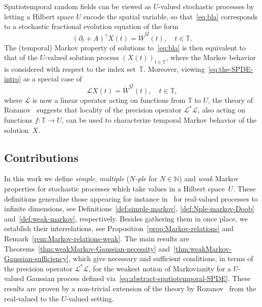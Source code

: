\documentclass[reqno]{amsart}
\numberwithin{equation}{section}
\newcommand{\bbT}{\mathbb{T}}
\newcommand{\N}{\mathbb{N}}
\newcommand{\cL}{\mathcal{L}}
\newcommand{\from}{\colon}
\theoremstyle{remark}
\theoremstyle{definition}
\begin{document}
Spatiotemporal random fields 
can be viewed as 
$U$-valued stochastic processes by 
letting a Hilbert space $U$ encode the spatial variable,
so that~\eqref{eq:bla} corresponds to
a stochastic fractional evolution equation 
of the form 
%
\begin{equation}\label{eq:the-SPDE-intro}
	(\partial_t + A)^\gamma X(t) = \dot W^Q(t), \quad t \in \bbT.
\end{equation}
%
The (temporal) Markov property of solutions to~\eqref{eq:bla} is then 
equivalent to that of the $U$-valued solution process $(X(t))_{t\in\bbT}$, 
where the Markov behavior is considered 
with respect to the index set~$\bbT$. 
Moreover, viewing~\eqref{eq:the-SPDE-intro} as a special case
of
%
\begin{equation}\label{eq:abstract-spatiotemporal-SPDE}
	\cL X(t) = \dot W^Q(t), 
	\quad 
	t \in \bbT,
\end{equation}
%
where $\cL$ is now a linear operator acting on functions from $\bbT$ to $U$,
the theory of Rozanov~\cite{Rozanov1982} suggests that 
locality of the precision operator $\cL^*\! \cL$,
also acting on functions $f \from \bbT \to U$, can be used to
characterize
temporal Markov behavior of the solution~$X$.

\subsection{Contributions}
In this work we define 
\emph{simple}, \emph{multiple} (\emph{$N$-ple} for $N \in \N$) and \emph{weak} Markov properties 
for stochastic processes which take values in a Hilbert space~$U$. 
These definitions generalize   
those appearing for instance in~\cite{HidaHitsuda1993, RevuzYor1999, Rozanov1982} 
for real-valued processes to infinite dimensions,  
see Definitions~\ref{def:simple-markov}, \ref{def:Nple-markov-Doob} and~\ref{def:weak-markov},
respectively.
Besides gathering them in once place, we establish their interrelations,
see Proposition~\ref{prop:Markov-relations} and Remark~\ref{rem:Markov-relations-weak}.
The main results are Theorems~\ref{thm:weakMarkov-Gaussian-necessity} and~\ref{thm:weakMarkov-Gaussian-sufficiency},
which give necessary and sufficient conditions, 
in terms of the precision operator $\cL^*\! \cL$, for the weakest notion of Markovianity for a $U$-valued
Gaussian process defined via~\eqref{eq:abstract-spatiotemporal-SPDE}.
These results are proven by a non-trivial extension of the theory by Rozanov~\cite[Chapters~2 and~3]{Rozanov1982} 
from the real-valued to the $U$-valued setting.
\end{document}
